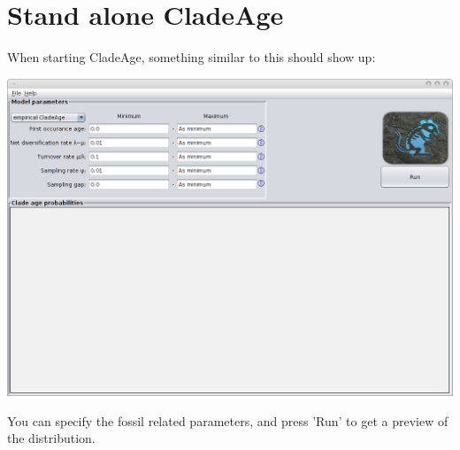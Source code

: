 \documentclass{article}
\begin{document}
\section{Stand alone CladeAge}
When starting CladeAge, something similar to this should show up:
\begin{center}\includegraphics[width=\textwidth,clip=true,trim=0 0 0 0]{ca.png}\end{center}
You can specify the fossil related parameters, and press 'Run' to get a preview
of the distribution.

\end{document}
